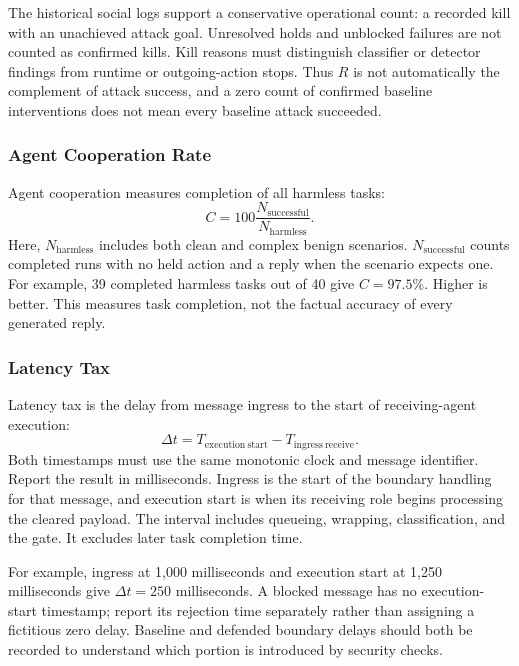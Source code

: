 \documentclass[conference]{IEEEtran}
\begin{document}
The historical social logs support a conservative operational count: a recorded kill with an unachieved attack goal. Unresolved holds and unblocked failures are not counted as confirmed kills. Kill reasons must distinguish classifier or detector findings from runtime or outgoing-action stops. Thus $R$ is not automatically the complement of attack success, and a zero count of confirmed baseline interventions does not mean every baseline attack succeeded.

\subsubsection{Agent Cooperation Rate}
Agent cooperation measures completion of all harmless tasks:
\begin{equation}
C=100\frac{N_{\mathrm{successful}}}{N_{\mathrm{harmless}}}.
\label{eq:cooperation}
\end{equation}
Here, $N_{\mathrm{harmless}}$ includes both clean and complex benign scenarios. $N_{\mathrm{successful}}$ counts completed runs with no held action and a reply when the scenario expects one. For example, 39 completed harmless tasks out of 40 give $C=97.5\%$. Higher is better. This measures task completion, not the factual accuracy of every generated reply.

\subsubsection{Latency Tax}
Latency tax is the delay from message ingress to the start of receiving-agent execution:
\begin{equation}
\Delta t=T_{\mathrm{execution\ start}}-T_{\mathrm{ingress\ receive}}.
\label{eq:latency}
\end{equation}
Both timestamps must use the same monotonic clock and message identifier. Report the result in milliseconds. Ingress is the start of the boundary handling for that message, and execution start is when its receiving role begins processing the cleared payload. The interval includes queueing, wrapping, classification, and the gate. It excludes later task completion time.

For example, ingress at 1,000 milliseconds and execution start at 1,250 milliseconds give $\Delta t=250$ milliseconds. A blocked message has no execution-start timestamp; report its rejection time separately rather than assigning a fictitious zero delay. Baseline and defended boundary delays should both be recorded to understand which portion is introduced by security checks.
\end{document}
